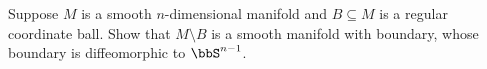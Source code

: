 Suppose $M$ is a smooth $n$-dimensional manifold and $B \subseteq M$ is a regular coordinate ball.  Show that $M \setminus B$ is a smooth manifold with boundary, whose boundary is diffeomorphic to $\bbS^{n-1}$.
